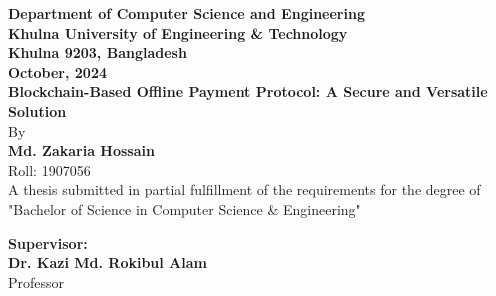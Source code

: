 \documentclass[12pt]{article}
\begin{document}
\begin{titlepage}
\begin{center}
    {\fontsize{12}{1.5}\selectfont \textbf{Department of Computer Science and Engineering}}\\
    \vspace{12pt}
    {\fontsize{12}{1.5}\selectfont \textbf{Khulna University of Engineering \& Technology}}\\
    \vspace{12pt}
    {\fontsize{12}{1.5}\selectfont \textbf{Khulna 9203, Bangladesh}}\\
    \vspace{12pt}
    {\fontsize{12}{1.5}\selectfont \textbf{October, 2024}}\\
    
    {\fontsize{18}{1.5}\selectfont \textbf{Blockchain-Based Offline Payment Protocol: A Secure and Versatile Solution}}\\
    \vspace{12pt}
    \vspace{12pt}
    \vspace{12pt}
    {\fontsize{12}{1.5}\selectfont By}\\
    \vspace{12pt}
    \vspace{12pt}
    {\fontsize{12}{1.5}\selectfont \textbf{Md. Zakaria Hossain}}\\
    \vspace{12pt}
    {\fontsize{12}{1.5}\selectfont Roll: 1907056}\\
    \vspace{12pt}
    \vspace{12pt}
    {\fontsize{12}{1.5}\selectfont A thesis submitted in partial fulfillment of the requirements for the degree of \\
    "Bachelor of Science in Computer Science \& Engineering" }\\
    \vspace{12pt}
    \vspace{12pt}
    \begin{flushleft}
    {\fontsize{12}{1.5}\selectfont \textbf{Supervisor:}}\\
    \hspace*{0.8in} %
    {\fontsize{12}{1.5}\selectfont \textbf{Dr. Kazi Md. Rokibul Alam}}\\
    \hspace*{0.8in} %
    {\fontsize{12}{1.5}\selectfont Professor}\\
    \hspace*{0.8in} %

\end{flushleft}
\end{center}
\end{titlepage}
\end{document}
